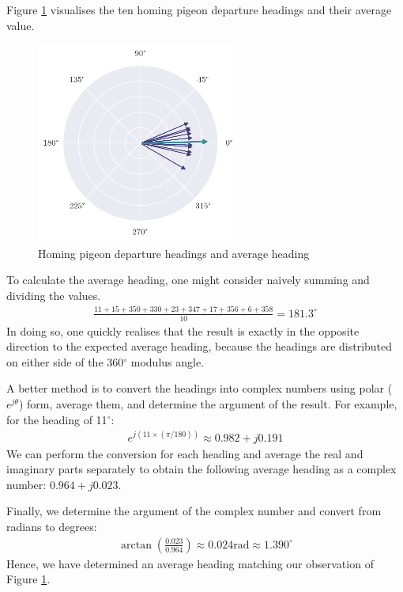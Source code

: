 \documentclass[a4paper, 11pt]{article}
\begin{document}
Figure \ref{fig:q9_headings} visualises the ten homing pigeon departure headings
and their average value.

\begin{figure}[ht]
    \centering
    \includegraphics[width=0.6\textwidth]{images/q9_headings.png}
    \caption{Homing pigeon departure headings and average heading}
    \label{fig:q9_headings}
\end{figure}

To calculate the average heading, one might consider naively summing and
dividing the values.
\begin{align*}
    \frac{11+15+350+330+23+347+17+356+6+358}{10} = 181.3^\circ
\end{align*}
In doing so, one quickly realises that the result is exactly in the opposite
direction to the expected average heading, because the headings are distributed
on either side of the 360$^\circ$ modulus angle.

A better method is to convert the headings into complex numbers using polar
($e^{j\theta}$) form, average them, and determine the argument of the result.
For example, for the heading of 11$^\circ$:
\begin{align*}
    e^{j(11\times(\pi/180))} \approx 0.982+j0.191
\end{align*}
We can perform the conversion for each heading and average the real and
imaginary parts separately to obtain the following average heading as a complex
number: $0.964+j0.023$.

Finally, we determine the argument of the complex number and convert from
radians to degrees:
\begin{align*}
    \arctan(\frac{0.023}{0.964}) \approx 0.024 \text{rad} \approx 1.390^\circ
\end{align*}
Hence, we have determined an average heading matching our observation of Figure
\ref{fig:q9_headings}.
\end{document}

